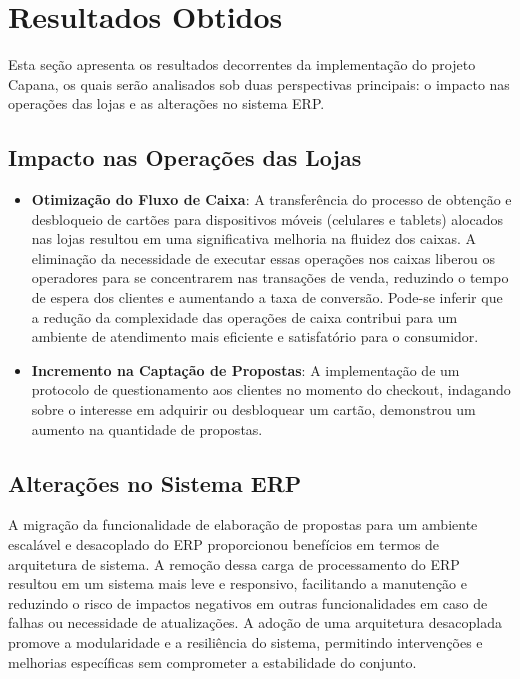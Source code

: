 \chapter{Resultados Obtidos}

Esta seção apresenta os resultados decorrentes da implementação do projeto Capana, os quais serão 
analisados sob duas perspectivas principais: o impacto nas operações das lojas e as alterações no 
sistema ERP.

\section{Impacto nas Operações das Lojas}

\begin{itemize}

    \item \textbf{Otimização do Fluxo de Caixa}: A transferência do processo de 
    obtenção e desbloqueio de cartões para dispositivos móveis (celulares e tablets) 
    alocados nas lojas resultou em uma significativa melhoria na fluidez dos caixas. 
    A eliminação da necessidade de executar essas operações nos caixas liberou os 
    operadores para se concentrarem nas transações de venda, reduzindo o tempo de 
    espera dos clientes e aumentando a taxa de conversão. Pode-se inferir que a 
    redução da complexidade das operações de caixa contribui para um ambiente de 
    atendimento mais eficiente e satisfatório para o consumidor.

    \item \textbf{Incremento na Captação de Propostas}: A implementação de um protocolo de questionamento aos clientes no 
    momento do checkout, indagando sobre o interesse em adquirir ou desbloquear um cartão, demonstrou um aumento na 
    quantidade de propostas.

\end{itemize}

\section{Alterações no Sistema ERP}

A migração da funcionalidade de elaboração de propostas para um ambiente escalável e desacoplado do ERP proporcionou 
benefícios em termos de arquitetura de sistema. A remoção dessa carga de processamento do ERP resultou em um sistema 
mais leve e responsivo, facilitando a manutenção e reduzindo o risco de impactos negativos em outras funcionalidades em 
caso de falhas ou necessidade de atualizações. A adoção de uma arquitetura desacoplada promove a modularidade e a 
resiliência do sistema, permitindo intervenções e melhorias específicas sem comprometer a estabilidade do conjunto.

